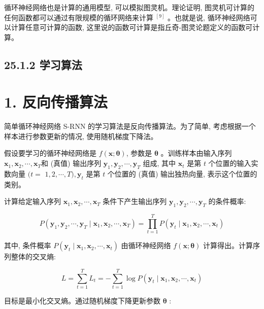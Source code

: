 \documentclass[10pt]{article}
\begin{document}
循环神经网络也是计算的通用模型, 可以模拟图灵机。理论证明, 图灵机可计算的任何函数都可以通过有限规模的循环网络来计算 ${ }^{[9]}$ 。也就是说, 循环神经网络可以计算任意可计算的函数, 这里说的函数可计算是指丘奇-图灵论题定义的函数可计算。

\subsection*{25.1.2 学习算法}
\section*{1. 反向传播算法}
简单循环神经网络 S-RNN 的学习算法是反向传播算法。为了简单, 考虑根据一个样本进行参数更新的情况, 使用随机梯度下降法。

假设要学习的循环神经网络是 $f(\boldsymbol{x} ; \boldsymbol{\theta})$, 参数是 $\boldsymbol{\theta}$ 。训练样本由输入序列 $\boldsymbol{x}_{1}, \boldsymbol{x}_{2}, \cdots, \boldsymbol{x}_{T}$和 (真值) 输出序列 $\boldsymbol{y}_{1}, \boldsymbol{y}_{2}, \cdots, \boldsymbol{y}_{T}$ 组成, 其中 $\boldsymbol{x}_{t}$ 是第 $t$ 个位置的输入实数向量 $(t=$ $1,2, \cdots, T), \boldsymbol{y}_{t}$ 是第 $t$ 个位置的 (真值) 输出独热向量, 表示这个位置的类别。

计算给定输入序列 $\boldsymbol{x}_{1}, \boldsymbol{x}_{2}, \cdots, \boldsymbol{x}_{T}$ 条件下产生输出序列 $\boldsymbol{y}_{1}, \boldsymbol{y}_{2}, \cdots, \boldsymbol{y}_{T}$ 的条件概率:


\begin{equation*}
P\left(\boldsymbol{y}_{1}, \boldsymbol{y}_{2}, \cdots, \boldsymbol{y}_{T} \mid \boldsymbol{x}_{1}, \boldsymbol{x}_{2}, \cdots, \boldsymbol{x}_{T}\right)=\prod_{t=1}^{T} P\left(\boldsymbol{y}_{t} \mid \boldsymbol{x}_{1}, \boldsymbol{x}_{2}, \cdots, \boldsymbol{x}_{t}\right) \tag{25.7}
\end{equation*}


其中, 条件概率 $P\left(\boldsymbol{y}_{t} \mid \boldsymbol{x}_{1}, \boldsymbol{x}_{2}, \cdots, \boldsymbol{x}_{t}\right)$ 由循环神经网络 $f(\boldsymbol{x} ; \boldsymbol{\theta})$ 计算得出。计算序列整体的交叉熵:


\begin{equation*}
L=\sum_{t=1}^{T} L_{t}=-\sum_{t=1}^{T} \log P\left(\boldsymbol{y}_{t} \mid \boldsymbol{x}_{1}, \boldsymbol{x}_{2}, \cdots, \boldsymbol{x}_{t}\right) \tag{25.8}
\end{equation*}


目标是最小化交叉熵。通过随机梯度下降更新参数 $\boldsymbol{\theta}$ :
\end{document}
